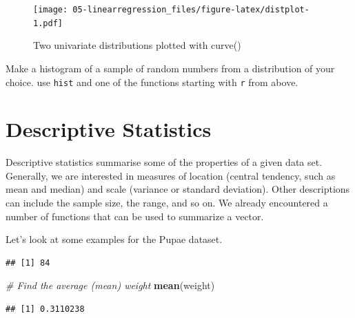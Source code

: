 \documentclass[]{book}
\newenvironment{Shaded}{\begin{snugshade}}{\end{snugshade}}
\newcommand{\CommentTok}[1]{\textcolor[rgb]{0.56,0.35,0.01}{\textit{#1}}}
\newcommand{\KeywordTok}[1]{\textcolor[rgb]{0.13,0.29,0.53}{\textbf{#1}}}
\newcommand{\NormalTok}[1]{#1}
\newcommand{\OperatorTok}[1]{\textcolor[rgb]{0.81,0.36,0.00}{\textbf{#1}}}
\newcommand{\StringTok}[1]{\textcolor[rgb]{0.31,0.60,0.02}{#1}}
\let\BeginKnitrBlock\begin \let\EndKnitrBlock\end
\begin{document}
\begin{figure}
\centering
\texttt{[image: 05-linearregression\_files/figure-latex/distplot-1.pdf]}
\caption{\label{fig:distplot}Two univariate distributions plotted with curve()}
\end{figure}

\BeginKnitrBlock{rmdtry}
Make a histogram of a sample of random numbers from a distribution of your choice. use \texttt{hist} and one of the functions starting with \texttt{r} from above.
\EndKnitrBlock{rmdtry}

\hypertarget{descstat}{%
\section{Descriptive Statistics}\label{descstat}}

Descriptive statistics summarise some of the properties of a given data set. Generally, we are interested in measures of location (central tendency, such as mean and median) and scale (variance or standard deviation). Other descriptions can include the sample size, the range, and so on. We already encountered a number of functions that can be used to summarize a vector.

Let's look at some examples for the Pupae dataset.

\begin{Shaded}
\end{Shaded}

\begin{verbatim}
## [1] 84
\end{verbatim}

\begin{Shaded}
\begin{Highlighting}[]
\CommentTok{# Find the average (mean) weight}
\KeywordTok{mean}\NormalTok{(weight)}
\end{Highlighting}
\end{Shaded}

\begin{verbatim}
## [1] 0.3110238
\end{verbatim}
\end{document}
